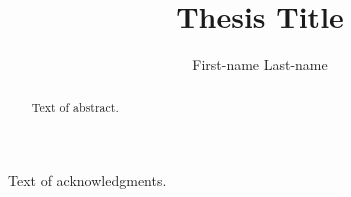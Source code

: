
\author{First-name Last-name}
\title{Thesis Title}
\PhD                            %
\cosupervisor                   %




\begin{abstract}
  Text of abstract.  
\end{abstract}

\begin{acknowledgments}
  Text of acknowledgments.
\end{acknowledgments}




